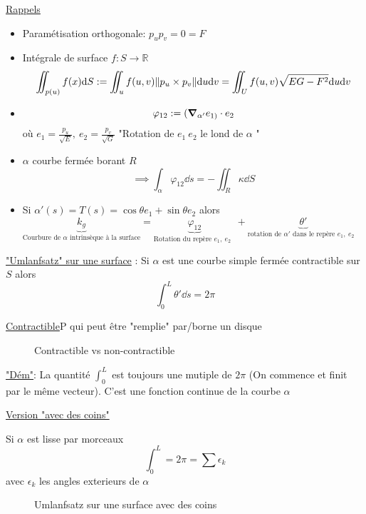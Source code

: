 



\underline{Rappels}

\begin{itemize}

	\item Paramétisation orthogonale: $p_u p_v =0 = F$ 
	\item Intégrale de surface $f: S \to \mathbb{R}$ $$\iint_{p(u)} f(x) \dd S := \iint_u f(u,v) \norm{p_u \times  p_v } \dd u\dd v = \iint_U f(u,v) \sqrt{EG-F^2}\dd u \dd v$$ 
	\item $$\varphi_{12} := (\grad_{\alpha'} e_{1)} \cdot e_2$$ où $e_1 = \frac{p_u}{\sqrt{E}} ,\ e_2 = \frac{p_v}{\sqrt{G}} $  "Rotation de $e_{1}\ e_2 $ le lond de $\alpha$ "  
	\item $\alpha$ courbe fermée borant $R$ $$\implies \int_{\alpha} \varphi_{12} \dd s = - \iint_R \kappa \dd S $$   
	\item Si $\alpha'(s) = T(s) = \cos \theta e_{1} + \sin \theta e_2$ alors $\underbrace{k_g}_{\text{Courbure de $\alpha$ intrinsèque à la surface} }  = \underbrace{\varphi_{12}}_{\text{Rotation du repère $e_{1},\ e_2$ } }  + \underbrace{\theta'}_{\text{rotation de $\alpha'$ dans le repère $e_1 , \ e_2$ } }  $  
	
\end{itemize}


\underline{"Umlanfsatz" sur une surface} : Si $\alpha$ est une courbe simple fermée contractible sur $S$ alors $$\int_0^L \theta' \dd s = 2\pi$$  


\underline{Contractible}P qui peut être "remplie" par/borne un disque 

\begin{figure}[ht]
    \centering
    \caption{Contractible vs non-contractible}
    \label{fig:contractible-vs-non-contractible}
\end{figure}

\underline{"Dém"}: La quantité $\int_0^L$ est toujours une mutiple de $2 \pi$ (On commence et finit par le même vecteur). C'est une fonction continue de la courbe $\alpha$    

\underline{Version "avec des coins"} 

Si $\alpha$ est lisse par morceaux $$\int_0^L = 2\pi = \sum \epsilon_k$$ avec $\epsilon_k$ les angles exterieurs de $\alpha$    

\begin{figure}[ht]
    \centering
    \caption{Umlanfsatz sur une surface avec des coins}
    \label{fig:umlanfsatz-sur-une-surface-avec-des-coins}
\end{figure}
	
